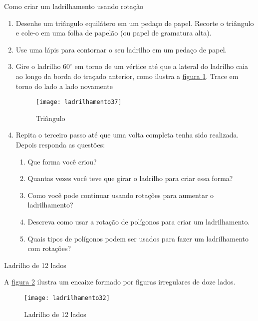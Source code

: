 {\begin{task}{Como criar um ladrilhamento usando rotação}

\begin{enumerate}
	\item Desenhe um triângulo equilátero em um pedaço de papel. Recorte o triângulo e cole-o em uma folha de papelão (ou papel de gramatura alta).
	\item Use uma lápis para contornar o seu ladrilho em um pedaço de papel.
	\item Gire o ladrilho $60^{\circ}$ em torno de um vértice até que a lateral do ladrilho caia ao longo da borda do traçado anterior, como ilustra a \hyperref[transf4]{figura \ref{transf4}}. Trace em torno do lado a lado novamente

	\begin{figure}[H]
	\centering
	\texttt{[image: ladrilhamento37]}
	\caption{Triângulo}
	\label{transf4}
	\end{figure}

	\item Repita o terceiro passo até que uma volta completa tenha sido realizada. Depois responda as questões:
	\begin{enumerate}
		\item Que forma você criou?
		\item Quantas vezes você teve que girar o ladrilho para criar essa forma?
		\item Como você pode continuar usando rotações para aumentar o ladrilhamento?
		\item Descreva como usar a rotação de polígonos para criar um ladrilhamento.
	\item Quais tipos de polígonos podem ser usados para fazer um ladrilhamento com rotações?
		
	\end{enumerate}

	
\end{enumerate}

\end{task}

\begin{task}{Ladrilho de 12 lados}

A \hyperref[12lados]{figura \ref{12lados}} ilustra um encaixe formado por figuras irregulares de doze lados. 

	\begin{figure}[H]
	\centering
	\texttt{[image: ladrilhamento32]}
	\caption{Ladrilho de 12 lados}
	\label{12lados}
	\end{figure}
	

\end{task}}
